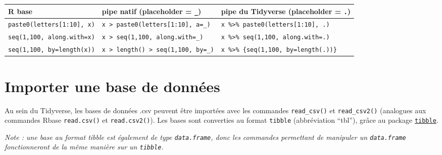 \documentclass[
]{book}
\newcounter{none} %
\begin{document}
{\def\LTcaptype{none} %
\begin{longtable}[]{@{}
  >{\centering\arraybackslash}p{}
  >{\centering\arraybackslash}p{}
  >{\centering\arraybackslash}p{}@{}}
\toprule\noalign{}
\begin{minipage}[b]{\linewidth}\centering
R base
\end{minipage} & \begin{minipage}[b]{\linewidth}\centering
pipe natif (placeholder = \texttt{\_})
\end{minipage} & \begin{minipage}[b]{\linewidth}\centering
pipe du Tidyverse (placeholder = \texttt{.})
\end{minipage} \\
\midrule\noalign{}
\endhead
\bottomrule\noalign{}
\endlastfoot
\texttt{paste0(letters{[}1:10{]},\ x)} & \texttt{x\ \textbar{}\textgreater{}\ paste0(letters{[}1:10{]},\ a=\_)} & \texttt{x\ \%\textgreater{}\%\ paste0(letters{[}1:10{]},\ .)} \\
\texttt{seq(1,100,\ along.with=x)} & \texttt{x\ \textbar{}\textgreater{}\ seq(1,100,\ along.with=\_)} & \texttt{x\ \%\textgreater{}\%\ seq(1,100,\ along.with=.)} \\
\texttt{seq(1,100,\ by=length(x))} & \texttt{x\ \textbar{}\textgreater{}\ length()\ \textbar{}\textgreater{}\ seq(1,100,\ by=\_)} & \texttt{x\ \%\textgreater{}\%\ \{seq(1,100,\ by=length(.))\}} \\
\end{longtable}
}

\section{Importer une base de données}\label{importer-une-base-de-donnuxe9es-1}

Au sein du Tidyverse, les bases de données .csv peuvent être importées avec les commandes \texttt{read\_csv()} et \texttt{read\_csv2()} (analogues aux commandes Rbase \texttt{read.csv()} et \texttt{read.csv2()}). Les bases sont converties au format \texttt{tibble} (abbréviation ``tbl''), grâce au package \href{https://tibble.tidyverse.org/}{\texttt{tibble}}.

\emph{Note : une base au format tibble est également de type \texttt{data.frame}, donc les commandes permettant de manipuler un \texttt{data.frame} fonctionneront de la même manière sur un \texttt{tibble}.}
\end{document}
